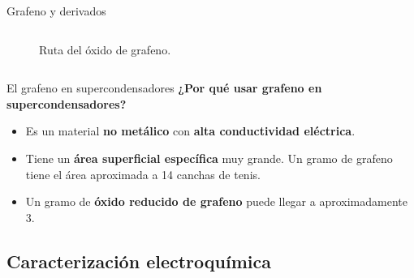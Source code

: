 \documentclass[aspectratio=169]{beamer}
\begin{document}
\begin{frame}{Grafeno y derivados}
\begin{columns}
\begin{column}{0.4\textwidth}
\begin{onlyenv}
\begin{figure}
						\caption{Ruta del óxido de grafeno.}
					\end{figure}
				\end{onlyenv}
			\end{column}
		\end{columns}
	\end{frame}

	\begin{frame}{El grafeno en supercondensadores}
		\only<1->\textbf{¿Por qué usar grafeno en supercondensadores?}
		\begin{itemize}[<+(1)->]
			\item Es un material \textbf{no metálico} con \textbf{alta conductividad eléctrica}.
			\item Tiene un \textbf{área superficial específica} muy grande. Un gramo de grafeno tiene el área aproximada a 14 canchas de tenis.
			\item Un gramo de \textbf{óxido reducido de grafeno} puede llegar a aproximadamente 3.
		\end{itemize}
	\end{frame}


	\subsection{Caracterización electroquímica}
	
\end{document}
